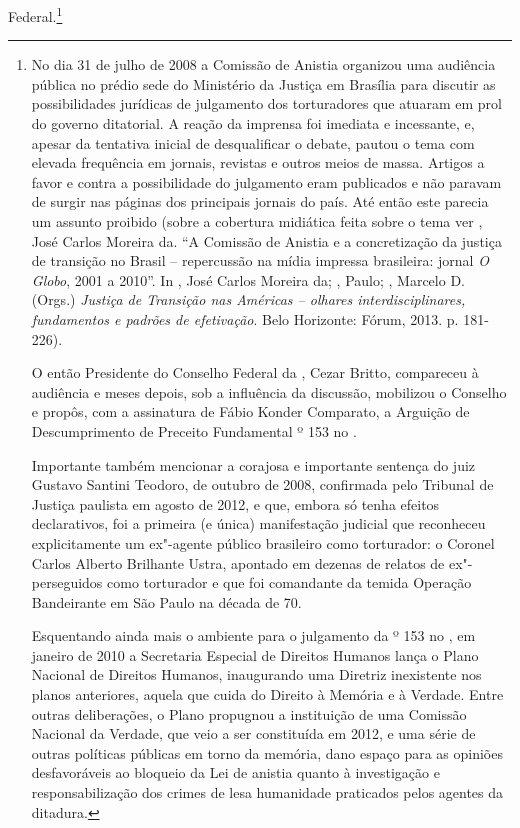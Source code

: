 Federal.\footnote{No dia 31 de julho de 2008 a Comissão de Anistia
  organizou uma audiência pública no prédio sede do Ministério da
  Justiça em Brasília para discutir as possibilidades jurídicas de
  julgamento dos torturadores que atuaram em prol do governo ditatorial.
  A reação da imprensa foi imediata e incessante, e, apesar da tentativa
  inicial de desqualificar o debate, pautou o tema com elevada
  frequência em jornais, revistas e outros meios de massa. Artigos a
  favor e contra a possibilidade do julgamento eram publicados e não
  paravam de surgir nas páginas dos principais jornais do país. Até
  então este parecia um assunto proibido (sobre a cobertura midiática
  feita sobre o tema ver  ,
  José Carlos Moreira da. ``A Comissão
  de Anistia e a concretização da justiça de transição no Brasil --
  repercussão na mídia impressa brasileira: jornal \emph{O Globo}, 2001 a
  2010''. In  , José Carlos Moreira
  da; , Paulo; ,
  Marcelo D. (Orgs.) \emph{Justiça de Transição nas Américas --
  olhares interdisciplinares, fundamentos e padrões de efetivação}. Belo
  Horizonte: Fórum, 2013. p. 181-226).

  O então Presidente do Conselho Federal da , Cezar Britto,
  compareceu à audiência e meses depois, sob a influência da discussão,
  mobilizou o Conselho e propôs, com a assinatura de Fábio Konder
  Comparato, a Arguição de Descumprimento de Preceito Fundamental º 153
  no .

  Importante também mencionar a corajosa e importante sentença do juiz
  Gustavo Santini Teodoro, de outubro de 2008, confirmada pelo Tribunal
  de Justiça paulista em agosto de 2012, e que, embora só tenha efeitos
  declarativos, foi a primeira (e única) manifestação judicial que
  reconheceu explicitamente um ex"-agente público brasileiro como
  torturador: o Coronel Carlos Alberto Brilhante Ustra, apontado em
  dezenas de relatos de ex"-perseguidos como torturador e que foi
  comandante da temida Operação Bandeirante em São Paulo na década de
  70.

  Esquentando ainda mais o ambiente para o julgamento da  º 153 no
  , em janeiro de 2010 a Secretaria Especial de Direitos Humanos
  lança o  Plano Nacional de Direitos Humanos, inaugurando uma
  Diretriz inexistente nos planos anteriores, aquela que cuida do
  Direito à Memória e à Verdade. Entre outras deliberações, o Plano
  propugnou a instituição de uma Comissão Nacional da Verdade, que veio
  a ser constituída em 2012, e uma série de outras políticas públicas em
  torno da memória, dano espaço para as opiniões desfavoráveis ao
  bloqueio da Lei de anistia quanto à investigação e responsabilização
  dos crimes de lesa humanidade praticados pelos agentes da ditadura.}

